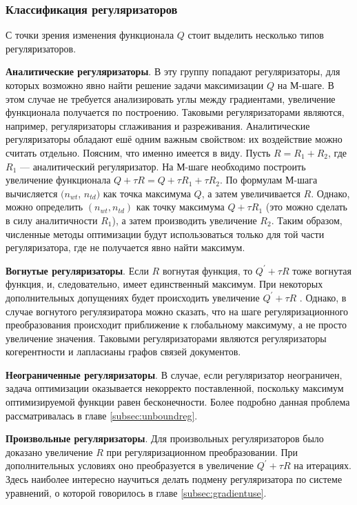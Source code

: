 \documentclass[12pt]{article}
\begin{document}
           \subsubsection{Классификация регуляризаторов}
С точки зрения изменения функционала $Q$ стоит выделить несколько типов регуляризаторов.

	 \textbf{Аналитические регуляризаторы}. В эту группу попадают регуляризаторы, для которых возможно явно найти решение  задачи  максимизации  $Q$ на М-шаге. В этом случае не требуется анализировать углы между градиентами, увеличение функционала получается по построению. Таковыми регуляризаторами являются, например, регуляризаторы сглаживания и разреживания. Аналитические регуляризаторы  обладают ешё одним важным свойством: их воздействие можно считать отдельно. Поясним, что именно имеется в виду. Пусть $R = R_1 + R_2$, где $R_1$ --- аналитический регуляризатор. На М-шаге необходимо построить увеличение функционала $Q + \tau R = Q + \tau R_1 + \tau R_2$. По формулам М-шага вычисляется $(n_{wt}$, $n_{td})$ как точка максимума $Q$, а затем увеличивается $R$.  Однако, можно определить $(n_{wt},n_{td})$ как точку максимума $Q + \tau R_1 $ (это можно сделать в силу аналитичности $R_1$), а затем производить увеличение $R_2$. Таким образом,  численные методы оптимизации будут использоваться только для той части регуляризатора, где не получается явно найти максимум.

	\textbf{Вогнутые регуляризаторы}. Если $R$ вогнутая функция, то $Q^{\prime} + \tau R$ тоже вогнутая функция, и, следовательно, имеет единственный максимум. При некоторых  дополнительных допущениях будет происходить увеличение $Q^{\prime} + \tau R$ . Однако, в случае вогнутого регулязиратора можно сказать, что на шаге регуляризационного преобразования происходит приближение к глобальному максимуму, а не просто увеличение значения. Таковыми регуляризаторами являются регуляризаторы когерентности и лапласианы графов связей документов.

	\textbf{Неограниченные регуляризаторы}. В случае, если регуляризатор неограничен, задача оптимизации оказывается некорректо поставленной, поскольку максимум оптимизируемой функции равен бесконечности. Более подробно данная проблема  рассматривалась в главе \ref{subsec:unboundreg}.

	\textbf{Произвольные регуляризаторы}. Для произвольных регуляризаторов было доказано увеличение $R$ при регуляризационном преобразовании. При дополнительных условиях оно преобразуется в увеличение $Q^{\prime} + \tau R$ на итерациях. Здесь наиболее интересно научиться делать подмену регуляризатора по системе уравнений, о которой говорилось в главе \ref{subsec:gradientuse}.
\end{document}
